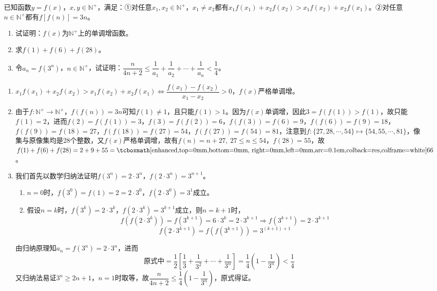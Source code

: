 \begin{que}
	已知函数$y=f(x)$，$x,y\in\mathbb{N}^+$，满足：①对任意$x_1,x_2\in\mathbb{N}^+$，$x_1\neq x_2$都有$x_1f(x_1)+x_2f(x_2)>x_1f(x_2)+x_2f(x_1)$。②对任意$n\in\mathbb{N}^+$都有$f[f(n)]=3n$。
	\begin{enumerate}
		\item 试证明：$f(x)$为$\mathbb{N}^+$上的单调增函数。
		\item 求$f(1)+f(6)+f(28)$。
		\item 令$a_n=f(3^n)$，$n\in\mathbb{N}^+$，试证明：$\dfrac{n}{4n+2}\leqslant \dfrac{1}{a_1}+\dfrac{1}{a_2}+\cdots+\dfrac{1}{a_n}<\dfrac{1}{4}$。
	\end{enumerate}
\end{que}
\sol \begin{enumerate}
	\item $x_1f(x_1)+x_2f(x_2)>x_1f(x_2)+x_2f(x_1)\Leftrightarrow \dfrac{f(x_1)-f(x_2)}{x_1-x_2}>0$，$f(x)$严格单调增。
	\item 由于$f:\mathbb{N}^+\rightarrow \mathbb{N}^+$，$f(f(n))=3n$可知$f(1)\neq 1$，且只能$f(1)>1$。因为$f(x)$单调增，因此$3=f(f(1))>f(1)$，故只能$f(1)=2$，进而$f(2)=f(f(1))=3$，$f(3)=f(f(2))=6$，$f(f(3))=f(6)=9$，$f(f(6))=f(9)=18$，$f(f(9))=f(18)=27$，$f(f(18))=f(27)=54$，$f(f(27))=f(54)=81$，注意到$f:\{27,28,\cdots,54\}\mapsto \{54,55,\cdots,81\}$，像集与原像集均是28个整数，又$f(x)$严格单调增，故有$f(n)=n+27,\ 27\leqslant n\leqslant 54$，$f(28)=55$，故$f(1)+f(6)+f(28)=2+9+55=\res{66}$。
	\item 我们首先以数学归纳法证明$f(3^n)=2\cdot 3^n$，$f(2\cdot 3^n)=3^{n+1}$。\begin{enumerate}
		\item $n=0$时，$f(3^0)=f(1)=2=2\cdot 3^0$，$f(2\cdot 3^0)=3^1$成立。
		\item 假设$n=k$时，$f(3^k)=2\cdot 3^k$，$f(2\cdot 3^k)=3^{k+1}$成立，则$n=k+1$时，$$f(f(2\cdot 3^k))=f(3^{k+1})=6\cdot 3^k=2\cdot 3^{k+1}\Rightarrow f(3^{k+1})=2\cdot 3^{k+1}$$$$
		f(2\cdot 3^{k+1})=f(f(3^{k+1}))=3^{(k+1)+1}$$
	\end{enumerate}由归纳原理知$a_n=f(3^n)=2\cdot 3^n$，进而
	$$\text{原式中}=\dfrac{1}{2}\left[\dfrac{1}{3}+\dfrac{1}{3^2}+\cdots+\dfrac{1}{3^n}\right]=\dfrac{1}{4}\left(1-\dfrac{1}{3^n}\right)<\dfrac{1}{4} $$又归纳法易证$3^n\geqslant 2n+1$，$n=1$时取等，故$\dfrac{n}{4n+2}\leqslant \dfrac{1}{4}\left(1-\dfrac{1}{3^n}\right)$，原式得证。
\end{enumerate}\par\hfill{}\normal\par

